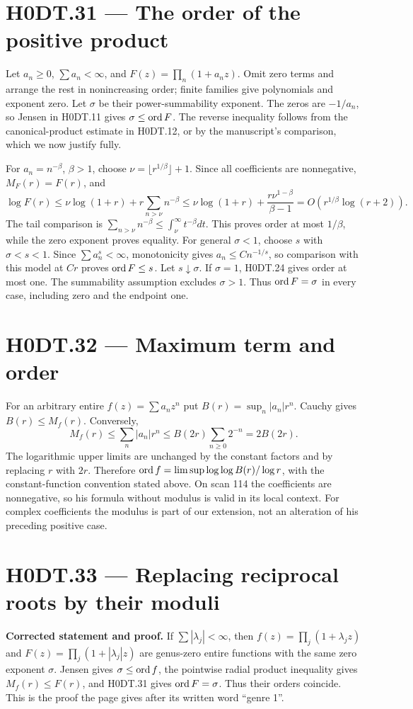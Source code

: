 \section*{H0DT.31 --- The order of the positive product}
Let $a_n\ge0$, $\sum a_n<\infty$, and $F(z)=\prod_n(1+a_nz)$. Omit zero terms and arrange the rest in nonincreasing order; finite families give polynomials and exponent zero. Let $\sigma$ be their power-summability exponent. The zeros are $-1/a_n$, so Jensen in H0DT.11 gives $\sigma\le\operatorname{ord} F$. The reverse inequality follows from the canonical-product estimate in H0DT.12, or by the manuscript's comparison, which we now justify fully.

For $a_n=n^{-\beta}$, $\beta>1$, choose $\nu=\lfloor r^{1/\beta}\rfloor+1$. Since all coefficients are nonnegative, $M_F(r)=F(r)$, and
\[
 \log F(r)\le\nu\log(1+r)+r\sum_{n>\nu}n^{-\beta}
 \le\nu\log(1+r)+\frac{r\nu^{1-\beta}}{\beta-1}
 =O(r^{1/\beta}\log(r+2)).
\]
The tail comparison is $\sum_{n>\nu}n^{-\beta}\le\int_\nu^\infty t^{-\beta}dt$. This proves order at most $1/\beta$, while the zero exponent proves equality. For general $\sigma<1$, choose $s$ with $\sigma<s<1$. Since $\sum a_n^s<\infty$, monotonicity gives $a_n\le Cn^{-1/s}$, so comparison with this model at $Cr$ proves $\operatorname{ord} F\le s$. Let $s\downarrow\sigma$. If $\sigma=1$, H0DT.24 gives order at most one. The summability assumption excludes $\sigma>1$. Thus $\operatorname{ord} F=\sigma$ in every case, including zero and the endpoint one.

\section*{H0DT.32 --- Maximum term and order}
For an arbitrary entire $f(z)=\sum a_nz^n$ put $B(r)=\sup_n|a_n|r^n$. Cauchy gives $B(r)\le M_f(r)$. Conversely,
\[
 M_f(r)\le\sum_n|a_n|r^n\le B(2r)\sum_{n\ge0}2^{-n}=2B(2r).
\]
The logarithmic upper limits are unchanged by the constant factors and by replacing $r$ with $2r$. Therefore $\operatorname{ord} f=\limsup\log\log B(r)/\log r$, with the constant-function convention stated above. On scan 114 the coefficients are nonnegative, so his formula without modulus is valid in its local context. For complex coefficients the modulus is part of our extension, not an alteration of his preceding positive case.

\section*{H0DT.33 --- Replacing reciprocal roots by their moduli}
\textbf{Corrected statement and proof.} If $\sum|\lambda_j|<\infty$, then $f(z)=\prod_j(1+\lambda_jz)$ and $F(z)=\prod_j(1+|\lambda_j|z)$ are genus-zero entire functions with the same zero exponent $\sigma$. Jensen gives $\sigma\le\operatorname{ord} f$, the pointwise radial product inequality gives $M_f(r)\le F(r)$, and H0DT.31 gives $\operatorname{ord} F=\sigma$. Thus their orders coincide. This is the proof the page gives after its written word ``genre 1''.

